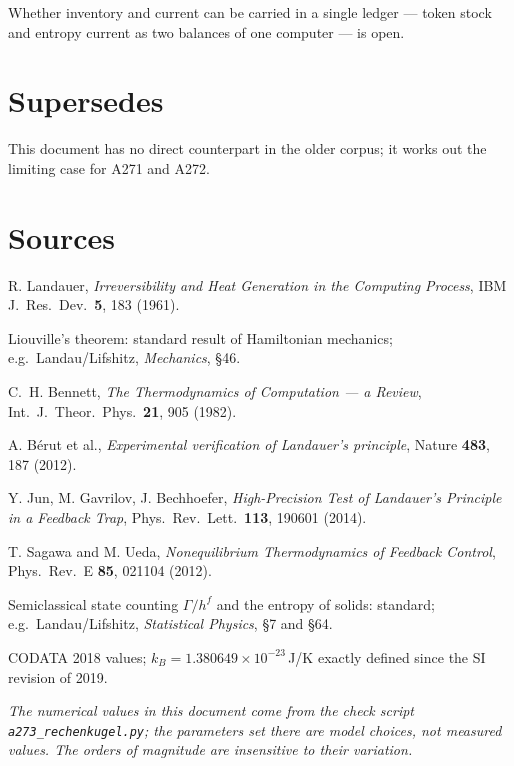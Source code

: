 Whether inventory and current can be carried in a single ledger --- token stock
and entropy current as two balances of one computer --- is open.

\section{Supersedes}

This document has no direct counterpart in the older corpus; it works out the
limiting case for A271 and A272.

\clearpage
{}
{}
\section*{Sources}

\begingroup
\small
\begin{description}[leftmargin=3.2em,style=sameline,itemsep=0.3em]

\item[{[B1]}] R. Landauer, \emph{Irreversibility and Heat Generation in the
Computing Process}, IBM J.\ Res.\ Dev.\ \textbf{5}, 183 (1961).

\item[{[B2]}] Liouville's theorem: standard result of Hamiltonian mechanics;
e.g.\ Landau/Lifshitz, \emph{Mechanics}, §46.

\item[{[B3]}] C.~H. Bennett, \emph{The Thermodynamics of Computation --- a
Review}, Int.\ J.\ Theor.\ Phys.\ \textbf{21}, 905 (1982).

\item[{[B4]}] A. Bérut et al., \emph{Experimental verification of Landauer's
principle}, Nature \textbf{483}, 187 (2012).

\item[{[B5]}] Y. Jun, M. Gavrilov, J. Bechhoefer, \emph{High-Precision Test of
Landauer's Principle in a Feedback Trap}, Phys.\ Rev.\ Lett.\ \textbf{113},
190601 (2014).

\item[{[B6]}] T. Sagawa and M. Ueda, \emph{Nonequilibrium Thermodynamics of
Feedback Control}, Phys.\ Rev.\ E \textbf{85}, 021104 (2012).

\item[{[B7]}] Semiclassical state counting $\Gamma/h^f$ and the entropy of
solids: standard; e.g.\ Landau/Lifshitz, \emph{Statistical Physics}, §7 and §64.

\item[{[B8]}] CODATA 2018 values; $k_B = 1.380649\times10^{-23}$\,J/K exactly
defined since the SI revision of 2019.

\end{description}
\endgroup

\vspace{1em}
\noindent
{\small\itshape The numerical values in this document come from the check script
\texttt{a273\_rechenkugel.py}; the parameters set there are model choices, not
measured values. The orders of magnitude are insensitive to their variation.}
